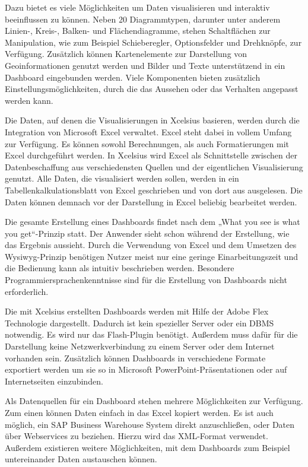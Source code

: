 \begin{onehalfspacing}
Dazu bietet es viele Möglichkeiten um Daten visualisieren und interaktiv beeinflussen zu können. Neben 20 Diagrammtypen, darunter unter anderem Linien-, Kreis-, Balken-  und Flächendiagramme, stehen Schaltflächen zur Manipulation, wie zum Beispiel Schieberegler, Optionsfelder und Drehknöpfe, zur Verfügung. Zusätzlich können Kartenelemente zur Darstellung von Geoinformationen genutzt werden und Bilder und Texte unterstützend in ein Dashboard eingebunden werden. Viele Komponenten bieten zusätzlich Einstellungsmöglichkeiten, durch die das Aussehen oder das Verhalten angepasst werden kann.

Die Daten, auf denen die Visualisierungen in Xcelsius basieren, werden durch die Integration von Microsoft Excel verwaltet. Excel steht dabei in vollem Umfang zur Verfügung. Es können sowohl  Berechnungen, als auch Formatierungen mit Excel durchgeführt werden. In Xcelsius wird Excel als Schnittstelle zwischen der Datenbeschaffung aus verschiedensten Quellen und der eigentlichen Visualisierung genutzt. Alle Daten, die visualisiert werden sollen, werden in ein Tabellenkalkulationsblatt von Excel geschrieben und von dort aus ausgelesen. Die Daten können demnach vor der Darstellung in Excel beliebig bearbeitet werden. %

Die gesamte Erstellung eines Dashboards findet nach dem „What you see is what you get“-Prinzip statt. Der Anwender sieht schon während der Erstellung, wie das Ergebnis aussieht. Durch die Verwendung von Excel und dem Umsetzen des Wysiwyg-Prinzip benötigen Nutzer meist nur eine geringe Einarbeitungszeit und die Bedienung kann als intuitiv beschrieben werden. Besondere Programmiersprachenkenntnisse sind für die Erstellung von Dashboards nicht erforderlich.

Die mit Xcelsius erstellten Dashboards werden mit Hilfe der Adobe Flex Technologie dargestellt. Dadurch ist kein spezieller Server oder ein \gls{DBMS} notwendig. Es wird nur das Flash-Plugin benötigt. Außerdem muss dafür für die Darstellung keine Netzwerkverbindung zu einem Server oder dem Internet vorhanden sein.  Zusätzlich können Dashboards in verschiedene Formate exportiert werden um sie so in Microsoft PowerPoint-Präsentationen oder auf Internetseiten einzubinden.

Als Datenquellen für ein Dashboard stehen mehrere Möglichkeiten zur Verfügung. Zum einen können Daten einfach in das Excel kopiert werden.  Es ist auch möglich, ein SAP Business Warehouse System direkt anzuschließen, oder Daten über Webservices zu beziehen. Hierzu wird das \gls{XML}-Format verwendet. Außerdem existieren weitere Möglichkeiten, mit dem Dashboards zum Beispiel untereinander Daten austauschen können.


\end{onehalfspacing}

